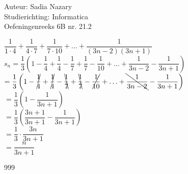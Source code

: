 \documentclass[a4paper]{article}
\begin{document}
  
\noindent \large Auteur: Sadia Nazary \\
\noindent \large Studierichting: Informatica\\
\noindent \large Oefeningenreeks 6B nr. 21.2\\

\medskip

\normalsize

$\dfrac{1}{1 \cdot 4} + \dfrac{1}{4 \cdot 7} + \dfrac{1}{7 \cdot 10} + \ldots + \dfrac{1}{(3n-2)(3n+1)}$\\

$s_n = \dfrac{1}{3} \left(1 - \dfrac{1}{4} + \dfrac{1}{4} - \dfrac{1}{7} + \dfrac{1}{7} - \dfrac{1}{10} + \ldots + \dfrac{1}{3n-2} - \dfrac{1}{3n+1} \right)$\\

$ = \dfrac{1}{3} \left(1 - \cancel{\dfrac{1}{4}} + \cancel{\dfrac{1}{4}} - \bcancel{\dfrac{1}{7}} + \bcancel{\dfrac{1}{7}} - \cancel{\dfrac{1}{10}} + \ldots + \bcancel{\dfrac{1}{3n-2}} - \dfrac{1}{3n+1} \right)$\\

$= \dfrac{1}{3} \left(1 - \dfrac{1}{3n+1} \right)$\\

$= \dfrac{1}{3} \left(\dfrac{3n+1}{3n+1} - \dfrac{1}{3n+1} \right)$\\

$= \dfrac{1}{3} \cdot \dfrac{3n}{3n+1}$\\

$= \dfrac{n}{3n+1}$\\

\begin{thebibliography}{999}
\end{thebibliography}
\end{document}
